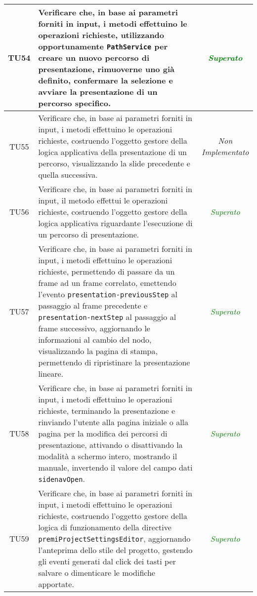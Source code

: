 \begin{longtable}{|c|>{}m{8cm}|c|}
\hypertarget{TU54}{TU54} & Verificare che, in base ai parametri forniti in input, i metodi effettuino le operazioni richieste, utilizzando opportunamente \texttt{PathService} per creare un nuovo percorso di presentazione, rimuoverne uno già definito, confermare la selezione e avviare la presentazione di un percorso specifico\finaleTestUnita{}. & \textcolor{Green}{\textit{Superato}}\\ \hline
\hypertarget{TU55}{TU55} & Verificare che, in base ai parametri forniti in input, i metodi effettuino le operazioni richieste, costruendo l'oggetto gestore della logica applicativa della presentazione di un percorso, visualizzando la slide precedente e quella successiva\finaleTestUnita{}. & \textit{Non Implementato}\\ \hline
\hypertarget{TU56}{TU56} & Verificare che, in base ai parametri forniti in input, il metodo effettui le operazioni richieste, costruendo l'oggetto gestore della logica applicativa riguardante l’esecuzione di un percorso di presentazione\finaleTestUnita{}. & \textcolor{Green}{\textit{Superato}}\\ \hline
\hypertarget{TU57}{TU57} & Verificare che, in base ai parametri forniti in input, i metodi effettuino le operazioni richieste, permettendo di passare da un frame ad un frame correlato, emettendo l'evento \texttt{presentation-previousStep} al passaggio al frame precedente e \texttt{presentation-nextStep} al passaggio al frame successivo, aggiornando le informazioni al cambio del nodo, visualizzando la pagina di stampa, permettendo di ripristinare la presentazione lineare\finaleTestUnita{}. & \textcolor{Green}{\textit{Superato}}\\ \hline
\hypertarget{TU58}{TU58} & Verificare che, in base ai parametri forniti in input, i metodi effettuino le operazioni richieste, terminando la presentazione e rinviando l'utente alla pagina iniziale o alla pagina per la modifica dei percorsi di presentazione, attivando o disattivando la modalità a schermo intero, mostrando il manuale, invertendo il valore del campo dati \texttt{sidenavOpen}\finaleTestUnita{}. & \textcolor{Green}{\textit{Superato}}\\ \hline
\hypertarget{TU59}{TU59} & Verificare che, in base ai parametri forniti in input, i metodi effettuino le operazioni richieste, costruendo l'oggetto gestore della logica di funzionamento della directive \texttt{premiProjectSettingsEditor}, aggiornando l'anteprima dello stile del progetto, gestendo gli eventi generati dal click dei tasti per salvare o dimenticare le modifiche apportate\finaleTestUnita{}. & \textcolor{Green}{\textit{Superato}}\\ \hline

\end{longtable}

